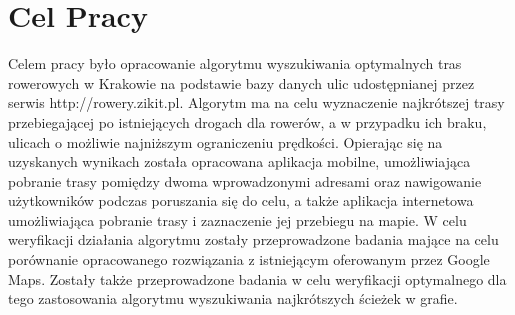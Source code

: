 \chapter{Cel Pracy}
\label{cha:cel_pracy}

Celem pracy było opracowanie algorytmu wyszukiwania optymalnych tras rowerowych w Krakowie na podstawie bazy danych ulic udostępnianej przez serwis http://rowery.zikit.pl. Algorytm ma na celu wyznaczenie najkrótszej trasy przebiegającej po istniejących drogach dla rowerów, a w przypadku ich braku, ulicach o możliwie najniższym ograniczeniu prędkości. Opierając się na uzyskanych wynikach została opracowana aplikacja mobilne, umożliwiająca pobranie trasy pomiędzy dwoma wprowadzonymi adresami oraz nawigowanie użytkowników podczas poruszania się do celu, a także aplikacja internetowa umożliwiająca pobranie trasy i zaznaczenie jej przebiegu na mapie. W celu weryfikacji działania algorytmu zostały przeprowadzone badania mające na celu porównanie opracowanego rozwiązania z istniejącym oferowanym przez Google Maps. Zostały także przeprowadzone badania w celu weryfikacji optymalnego dla tego zastosowania algorytmu wyszukiwania najkrótszych ścieżek w grafie.